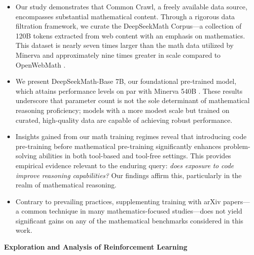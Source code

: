 \begin{itemize}[topsep=0pt]
    \item Our study demonstrates that Common Crawl, a freely available data source, encompasses substantial mathematical content. Through a rigorous data filtration framework, we curate the DeepSeekMath Corpus—a collection of 120B tokens extracted from web content with an emphasis on mathematics. This dataset is nearly seven times larger than the math data utilized by Minerva \citep{minerva} and approximately nine times greater in scale compared to OpenWebMath \citep{openwebmath}.

    \item We present DeepSeekMath-Base 7B, our foundational pre-trained model, which attains performance levels on par with Minerva 540B \citep{minerva}. These results underscore that parameter count is not the sole determinant of mathematical reasoning proficiency; models with a more modest scale but trained on curated, high-quality data are capable of achieving robust performance.

    \item Insights gained from our math training regimes reveal that introducing code pre-training before mathematical pre-training significantly enhances problem-solving abilities in both tool-based and tool-free settings. This provides empirical evidence relevant to the enduring query: \textit{does exposure to code improve reasoning capabilities?} Our findings affirm this, particularly in the realm of mathematical reasoning.

    \item Contrary to prevailing practices, supplementing training with arXiv papers—a common technique in many mathematics-focused studies—does not yield significant gains on any of the mathematical benchmarks considered in this work.
\end{itemize}

\textbf{Exploration and Analysis of Reinforcement Learning}

